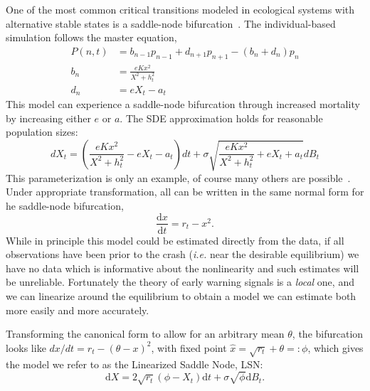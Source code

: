 \documentclass[authoryear,preprint,11pt]{elsarticle}
\newcommand{\ud}{\mathrm{d}}
\begin{document}
One of the most common critical transitions modeled in ecological systems with alternative stable states is a saddle-node bifurcation~\citep[\{emph{e.g.}[]{Scheffer2001, Scheffer2009, Guttal2008a, VanNes2007, Biggs2009}.
The individual-based simulation follows the master equation, 
\begin{align}
  P(n,t) &= b_{n-1} p_{n-1} + d_{n+1}p_{n+1} - (b_n+d_n)p_n  \label{master} \\ 
  b_n &= \frac{e K x^2}{X^2 + h_t^2} \\ 
  d_n &= e X_t - a_t   
\end{align}
This model can experience a saddle-node bifurcation through increased mortality by increasing either $e$ or $a$. 
The SDE approximation holds for reasonable population sizes:
\begin{equation}
dX_t = \left( \frac{e K x^2}{X^2 + h_t^2} - e X_t - a_t\right) dt + \sigma \sqrt{ \frac{e K x^2}{X^2 + h_t^2} + e X_t + a_t} dB_t \label{ass}
\end{equation}
This parameterization is only an example, of course many others are possible~\citep{Scheffer2009, Scheffer2001, Strogatz2001a, Guckenheimer1983}. 
Under appropriate transformation, all can be written in the same normal form for he saddle-node bifurcation,
\begin{equation}
\frac{\ud x}{\ud t} = r_t- x^2.
\label{saddle-node}
\end{equation}
While in principle this model could be estimated directly from the data,
if all observations have been prior to the crash (\emph{i.e.} near the desirable equilibrium)
we have no data which is informative about the nonlinearity and such estimates will be unreliable.  
Fortunately the theory of early warning signals is a \emph{local} one, 
and we can linearize around the equilibrium to obtain a model we can estimate both more easily and more accurately.  

Transforming the canonical form to allow for an arbitrary mean $\theta$,
the bifurcation looks like $ dx/dt = r_t- (\theta-x)^2 $, with fixed point $\hat x = \sqrt{r_t} +\theta =: \phi$,
which gives the model we refer to as the Linearized Saddle Node, LSN: 
\begin{equation}
\ud X = 2\sqrt{ r_t } (\phi - X_t)\ud t + \sigma\sqrt{\phi } \ud B_t. \label{LSN}
\end{equation}
\end{document}
